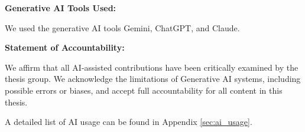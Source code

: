 \noindent
\textbf{Generative AI Tools Used:}  
\par We used the generative AI tools Gemini, ChatGPT, and Claude.

\medskip
\noindent
\textbf{Statement of Accountability:}

\noindent
We affirm that all AI-assisted contributions have been critically examined by the thesis group. We acknowledge the limitations of Generative AI systems, including possible errors or biases, and accept full accountability for all content in this thesis.

\noindent
A detailed list of AI usage can be found in Appendix \ref{sec:ai_usage}.

\clearpage